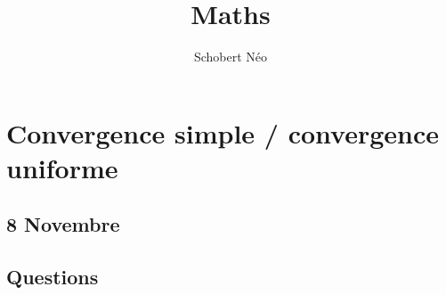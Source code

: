 \documentclass[a4paper, 11pt, hidelinks]{article}
\begin{document}
\newcommand{\grad}[1]{\vv{grad}#1}


\title{Maths}
\author{Schobert Néo}

\maketitle

\tableofcontents

\newpage 



\section{Convergence simple / convergence uniforme}

\subsection{8 Novembre}

\subsection{Questions}
\end{document}
